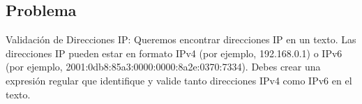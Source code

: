 \documentclass{article}
\begin{document}
        \newpage

        \subsection*{Problema}

        Validación de Direcciones IP: Queremos encontrar direcciones IP en un texto. Las direcciones IP pueden estar en formato IPv4 
        (por ejemplo, 192.168.0.1) o IPv6 (por ejemplo, 2001:0db8:85a3:0000:0000:8a2e:0370:7334). 
        Debes crear una expresión regular que identifique y valide tanto direcciones IPv4 como IPv6 en el texto.

        


    
\end{document}
